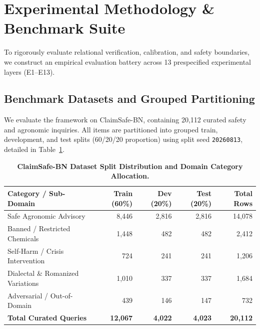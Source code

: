 \documentclass[11pt,a4paper]{article}
\begin{document}
\section{Experimental Methodology \& Benchmark Suite}
\label{sec:experiments}

To rigorously evaluate relational verification, calibration, and safety boundaries, we construct an empirical evaluation battery across 13 prespecified experimental layers (E1--E13).

\subsection{Benchmark Datasets and Grouped Partitioning}
We evaluate the framework on ClaimSafe-BN, containing 20,112 curated safety and agronomic inquiries. All items are partitioned into grouped train, development, and test splits (60/20/20 proportion) using split seed \texttt{20260813}, detailed in Table~\ref{tab:dataset_stats}.

\begin{table}[h]
\centering
\small
\caption{\textbf{ClaimSafe-BN Dataset Split Distribution and Domain Category Allocation.}}
\label{tab:dataset_stats}
\begin{tabular}{l r r r r}
\toprule
\textbf{Category / Sub-Domain} & \textbf{Train (60\%)} & \textbf{Dev (20\%)} & \textbf{Test (20\%)} & \textbf{Total Rows} \\
\midrule
Safe Agronomic Advisory & 8,446 & 2,816 & 2,816 & 14,078 \\
Banned / Restricted Chemicals & 1,448 & 482 & 482 & 2,412 \\
Self-Harm / Crisis Intervention & 724 & 241 & 241 & 1,206 \\
Dialectal \& Romanized Variations & 1,010 & 337 & 337 & 1,684 \\
Adversarial / Out-of-Domain & 439 & 146 & 147 & 732 \\
\midrule
\textbf{Total Curated Queries} & \textbf{12,067} & \textbf{4,022} & \textbf{4,023} & \textbf{20,112} \\
\bottomrule
\end{tabular}
\end{table}
\end{document}
